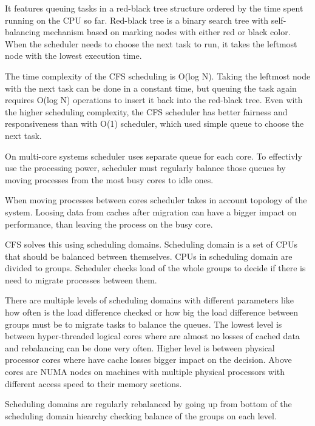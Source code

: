It features queuing tasks in a red-black tree structure ordered by the time spent
running on the CPU so far. Red-black tree is a binary search
tree with self-balancing mechanism based on marking nodes with either red or
black color.
When the scheduler needs to choose the next task to run, it
takes the leftmost node with the lowest execution time. 

The time complexity of the CFS scheduling is O(log N). Taking the leftmost node with
the next task can be done in a constant time, but queuing the task again requires
O(log N) operations to insert it back into the red-black tree. Even with the
higher scheduling complexity, the CFS scheduler has better fairness and
responsiveness than with O(1) scheduler, which used simple queue to choose the
next task.

On multi-core systems scheduler uses separate queue for each core. To effectivly
use the processing power, scheduler must regularly balance those queues by
moving processes from the most busy cores to idle ones.

When moving processes between cores scheduler takes in account topology of the
system. Loosing data from caches after migration can have a bigger impact on
performance, than leaving the process on the busy core.

CFS solves this using scheduling domains. Scheduling domain is a set of CPUs
that should be balanced between themselves.
CPUs in scheduling domain are divided to groups. Scheduler checks load of the
whole groups to decide if there is need to migrate processes between them.

There are multiple levels of scheduling domains with different parameters like
how often is the load difference checked or how big the load difference between
groups must be to migrate tasks to balance the queues.
The lowest level is between hyper-threaded logical cores where are almost no
losses of cached data and rebalancing can be done very often.
Higher level is between physical processor cores where have cache losses bigger
impact on the decision. Above cores are NUMA nodes on machines with multiple
physical processors with different access speed to their memory sections.

Scheduling domains are regularly rebalanced by going up from bottom of the
scheduling domain hiearchy checking balance of the groups on each level.

